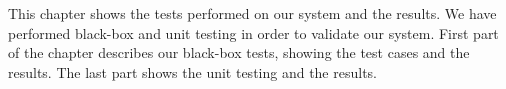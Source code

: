 This chapter shows the tests performed on our system and the results. We have performed black-box and unit testing in order to validate our system. First part of the chapter describes our black-box tests, showing the test cases and the results. The last part shows the unit testing and the results.